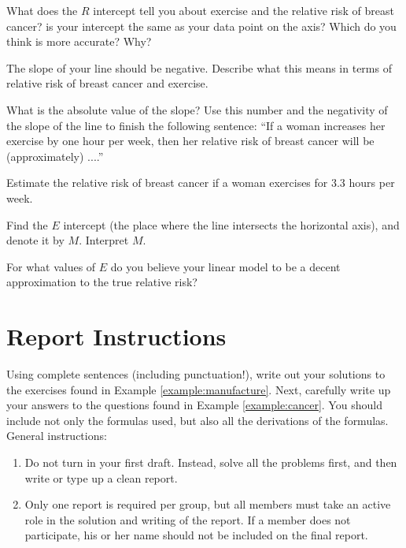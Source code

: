 \subprob  What does the $R$ intercept tell you about exercise and the
relative risk of breast cancer?  is your intercept the same as
your data point on the axis?  Which do you think is more accurate?
Why?

\subprob  The slope of your line should be negative.  Describe what this
means in terms of relative risk of breast cancer and exercise.

\subprob  What is the absolute value of the slope?  Use this number and
the negativity of the slope of the line to finish the following
sentence: ``If a woman increases her exercise by one hour per
week, then her relative risk of breast cancer will be
(approximately) ....''

\subprob  Estimate the relative risk of breast cancer if a woman
exercises for 3.3 hours per week.

\subprob  Find the $E$ intercept (the place where the line intersects
the horizontal axis), and denote it by $M$.  Interpret $M$.

\subprob  For what values of $E$ do you believe your linear model to be
a decent approximation to the true relative risk?
\noproblemfont

\section*{Report Instructions}
Using complete sentences (including punctuation!), write out your
solutions to the exercises found in Example \ref{example:manufacture}.
Next, carefully write up your answers to the questions found in
Example \ref{example:cancer}.  You should include not only the
formulas used, but also all the derivations of the formulas.  General
instructions:
\begin{enumerate}
\item Do not turn in your first draft.  Instead, solve all the
  problems first, and then write or type up a clean report.
\item Only one report is required per group, but all members must take
  an active role in the solution and writing of the report.  If a
  member does not participate, his or her name should not be included
  on the final report.
\end{enumerate}

